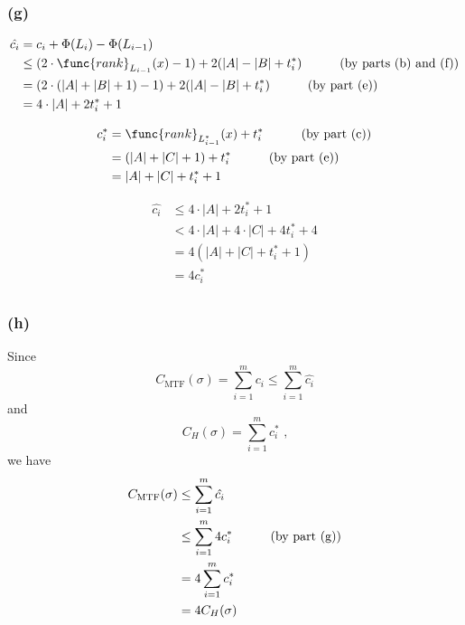 \subsubsection*{(g)}

\begin{equation*}
\begin{split}
    \hat{c_i} & = c_i + \Phi(L_i) - \Phi(L_{i - 1}) \\
    & \leq (2 \cdot \func{rank}_{L_{i-1}}(x) - 1) + 2 (|A| - |B| + t_i^*) 
    \text{\quad\quad\quad(by parts (b) and (f))} \\
    & = (2 \cdot (|A| + |B| + 1) - 1) + 2 (|A| - |B| + t_i^*) 
    \text{\quad\quad\quad(by part (e))} \\
    & = 4 \cdot |A| + 2t_i^* + 1 \\
\end{split}
\end{equation*}

\begin{equation*}
\begin{split}
    c_i^* & = \func{rank}_{L_{i-1}^*}(x) + t_i^* 
    \text{\quad\quad\quad(by part (c))} \\
    & = (|A| + |C| + 1) + t_i^*
    \text{\quad\quad\quad(by part (e))} \\
    & = |A| + |C| + t_i^* + 1 \\
\end{split}
\end{equation*}

\begin{equation*}
\begin{split}
    \hat{c_i} & \leq 4 \cdot |A| + 2t_i^* + 1 \\
    & < 4 \cdot |A| + 4 \cdot |C| + 4t_i^* + 4 \\
    & = 4(|A| + |C| + t_i^* + 1) \\
    & = 4 c_i^* \\
\end{split}
\end{equation*}

\subsubsection*{(h)}

Since
\begin{equation*}
    C_{\text{MTF}}(\sigma) = \sum\limits_{i = 1}^m c_i
    \leq \sum\limits_{i = 1}^m \hat{c_i}
\end{equation*}
and
\begin{equation*}
    C_H(\sigma) = \sum\limits_{i = 1}^m c_i^* \text{ ,}
\end{equation*}
we have
\begin{equation*}
\begin{split}
    C_{\text{MTF}}(\sigma) & \leq \sum\limits_{i = 1}^m \hat{c_i} \\
    & \leq \sum\limits_{i = 1}^m 4 c_i^* \text{\quad\quad\quad(by part (g))} \\
    & = 4 \sum\limits_{i = 1}^m c_i^* \\
    & = 4 C_H(\sigma) \\
\end{split}
\end{equation*}

 